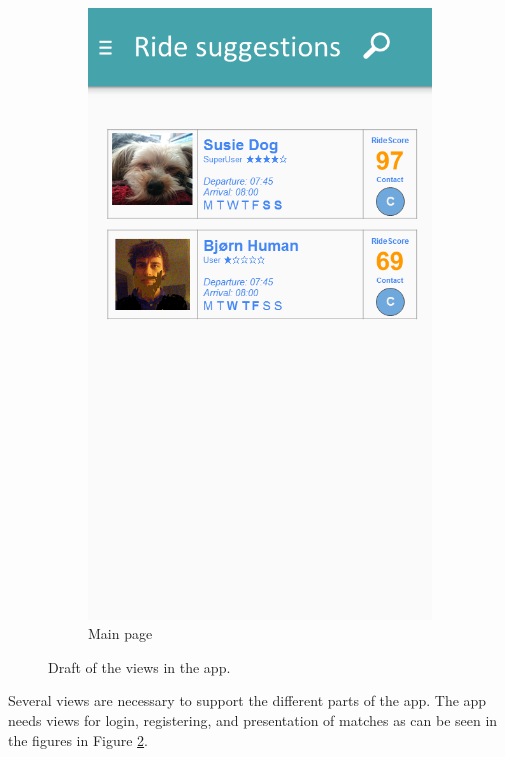 \begin{figure}[h!]
\begin{subfigure}[b]{0.3\textwidth}
		\includegraphics[width=\textwidth]{figures/GUI-main.png}
		\caption{Main page}
		\label{fig:GUI-main}
	\end{subfigure}
	 \caption{Draft of the views in the app.}\label{fig:GUI-firstrun}
\end{figure}

Several views are necessary to support the different parts of the app. 
The app needs views for login, registering, and presentation of matches as can be seen in the figures in Figure \ref{fig:GUI-firstrun}.

